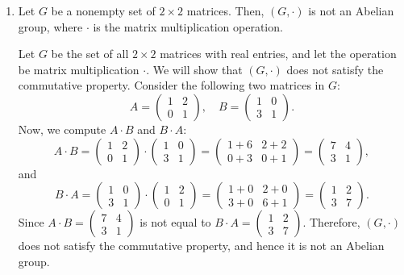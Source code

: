 \begin{enumerate}
  \item Let $G$ be a nonempty set of $2 \times 2$ matrices. 
  Then, $(G, \cdot)$ is not an Abelian group, 
  where $\cdot$ is the matrix multiplication operation.
  \begin{subprove}
    Let \(G\) be the set of all \(2 \times 2\) matrices with real entries, and let the operation be matrix multiplication \(\cdot\).
    We will show that \((G, \cdot)\) does not satisfy the commutative property.
    Consider the following two matrices in \(G\):
    \[
    A = \begin{pmatrix}
    1 & 2 \\
    0 & 1
    \end{pmatrix}, \quad
    B = \begin{pmatrix}
    1 & 0 \\
    3 & 1
    \end{pmatrix}.
    \]
    Now, we compute \(A \cdot B\) and \(B \cdot A\):
    \[
    A \cdot B = \begin{pmatrix}
    1 & 2 \\
    0 & 1
    \end{pmatrix} \cdot \begin{pmatrix}
    1 & 0 \\
    3 & 1
    \end{pmatrix} = \begin{pmatrix}
    1 + 6 & 2 + 2 \\
    0 + 3 & 0 + 1
    \end{pmatrix} = \begin{pmatrix}
    7 & 4 \\
    3 & 1
    \end{pmatrix},
    \]
    and
    \[
    B \cdot A = \begin{pmatrix}
    1 & 0 \\
    3 & 1
    \end{pmatrix} \cdot \begin{pmatrix}
    1 & 2 \\
    0 & 1
    \end{pmatrix} = \begin{pmatrix}
    1 + 0 & 2 + 0 \\
    3 + 0 & 6 + 1
    \end{pmatrix} = \begin{pmatrix}
    1 & 2 \\
    3 & 7
    \end{pmatrix}.
    \]
    Since \(A \cdot B = \begin{pmatrix}
    7 & 4 \\ 
    3 & 1 
    \end{pmatrix}\) is not equal to \(B \cdot A = \begin{pmatrix}
    1 & 2 \\
    3 & 7
    \end{pmatrix}\).
    Therefore, \((G, \cdot)\) does not satisfy the commutative property, and hence it is not an Abelian group.
  \end{subprove}
\end{enumerate}

